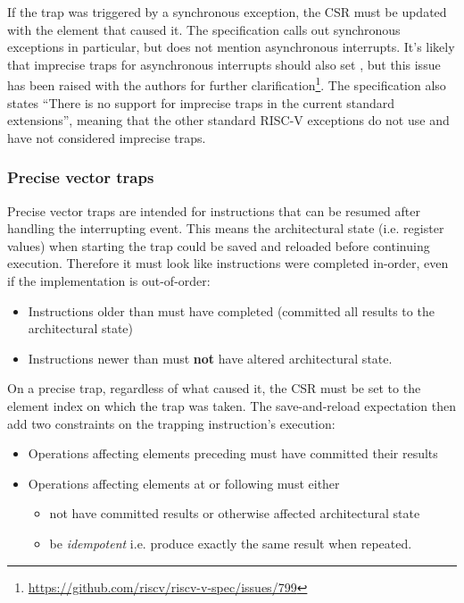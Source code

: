 If the trap was triggered by a synchronous exception, the  CSR must be updated with the element that caused it.
The specification calls out synchronous exceptions in particular, but does not mention asynchronous interrupts.
It's likely that imprecise traps for asynchronous interrupts should also set , but this issue has been raised with the authors for further clarification\footnote{\url{https://github.com/riscv/riscv-v-spec/issues/799}}.
The specification also states \enquote{There is no support for imprecise traps in the current standard extensions}, meaning that the other standard RISC-V exceptions do not use and have not considered imprecise traps.

\subsubsection{Precise vector traps}
Precise vector traps are intended for instructions that can be resumed after handling the interrupting event.
This means the architectural state (i.e. register values) when starting the trap could be saved and reloaded before continuing execution.
Therefore it must look like instructions were completed in-order, even if the implementation is out-of-order:
\begin{itemize}
    \item Instructions older than  must have completed (committed all results to the architectural state)
    \item Instructions newer than  must \textbf{not} have altered architectural state.
\end{itemize}

On a precise trap, regardless of what caused it, the  CSR must be set to the element index on which the trap was taken.
The save-and-reload expectation then add two constraints on the trapping instruction's execution:
\begin{itemize}
    \item Operations affecting elements preceding  must have committed their results
    \item Operations affecting elements at or following  must either
    \begin{itemize}
        \item not have committed results or otherwise affected architectural state
        \item be \emph{idempotent} i.e. produce exactly the same result when repeated.
    \end{itemize}
\end{itemize}

